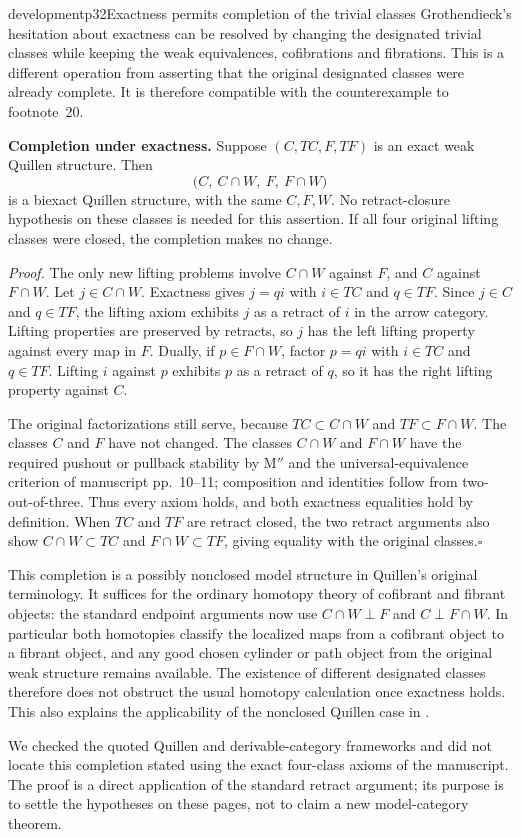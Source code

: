 \begin{dcomment}{development}{p32}{Exactness permits completion of the trivial classes}
Grothendieck's hesitation about exactness can be resolved by changing the designated trivial classes while keeping the weak equivalences, cofibrations and fibrations. This is a different operation from asserting that the original designated classes were already complete. It is therefore compatible with the counterexample to footnote~20.

\noindent\textbf{Completion under exactness.}\ours\quad
Suppose $(C,TC,F,TF)$ is an exact weak Quillen structure. Then
\[
 \bigl(C,\ C\cap W,\ F,\ F\cap W\bigr)
\]
is a biexact Quillen structure, with the same $C,F,W$. No retract-closure hypothesis on these classes is needed for this assertion. If all four original lifting classes were closed, the completion makes no change.

\emph{Proof.} The only new lifting problems involve $C\cap W$ against $F$, and $C$ against $F\cap W$. Let $j\in C\cap W$. Exactness gives $j=qi$ with $i\in TC$ and $q\in TF$. Since $j\in C$ and $q\in TF$, the lifting axiom exhibits $j$ as a retract of $i$ in the arrow category. Lifting properties are preserved by retracts, so $j$ has the left lifting property against every map in $F$. Dually, if $p\in F\cap W$, factor $p=qi$ with $i\in TC$ and $q\in TF$. Lifting $i$ against $p$ exhibits $p$ as a retract of $q$, so it has the right lifting property against $C$.

The original factorizations still serve, because $TC\subset C\cap W$ and $TF\subset F\cap W$. The classes $C$ and $F$ have not changed. The classes $C\cap W$ and $F\cap W$ have the required pushout or pullback stability by $\text{M}''$ and the universal-equivalence criterion of manuscript pp.~10--11; composition and identities follow from two-out-of-three. Thus every axiom holds, and both exactness equalities hold by definition. When $TC$ and $TF$ are retract closed, the two retract arguments also show $C\cap W\subset TC$ and $F\cap W\subset TF$, giving equality with the original classes.\hfill$\square$

This completion is a possibly nonclosed model structure in Quillen's original terminology. It suffices for the ordinary homotopy theory of cofibrant and fibrant objects: the standard endpoint arguments now use $C\cap W\perp F$ and $C\perp F\cap W$. In particular both homotopies classify the localized maps from a cofibrant object to a fibrant object, and any good chosen cylinder or path object from the original weak structure remains available. The existence of different designated classes therefore does not obstruct the usual homotopy calculation once exactness holds. This also explains the applicability of the nonclosed Quillen case in \citet[Example~5.2]{Cisinski2010}.

We checked the quoted Quillen and derivable-category frameworks and did not locate this completion stated using the exact four-class axioms of the manuscript. The proof is a direct application of the standard retract argument; its purpose is to settle the hypotheses on these pages, not to claim a new model-category theorem.
\end{dcomment}

